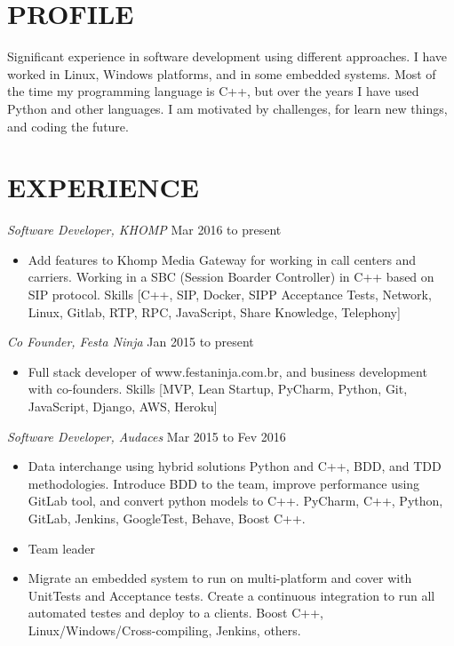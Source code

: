 \documentclass[line,margin]{res}
\begin{document}
\address{alvarofleith@gmail.com or +64 (09) 889-3534}
\address{https://linkedin.com/in/alvarofleith}


\begin{resume}

\section{PROFILE}       Significant experience in software development using different approaches. I have worked in Linux, Windows platforms, and in some embedded systems. Most of the time my programming language is C++, but over the years I have used Python and other languages. I am motivated by challenges, for learn new things, and coding the future.


 \section{EXPERIENCE} {\sl Software Developer, KHOMP} \hfill Mar 2016 to present \\
                 \begin{itemize}  \itemsep -2pt
                 \item Add features to Khomp Media Gateway for working in call centers and carriers. Working in a SBC (Session Boarder Controller) in C++ based on SIP protocol. Skills [C++, SIP, Docker, SIPP Acceptance Tests, Network, Linux, Gitlab, RTP, RPC, JavaScript, Share Knowledge, Telephony]
                \end{itemize}

                {\sl Co Founder, Festa Ninja} \hfill Jan 2015 to present \\
                 \begin{itemize}  \itemsep -2pt
                 \item Full stack developer of www.festaninja.com.br, and business development with co-founders. Skills [MVP, Lean Startup, PyCharm, Python, Git, JavaScript, Django, AWS, Heroku]
                 \end{itemize}

                {\sl Software Developer, Audaces} \hfill Mar 2015 to Fev 2016 \\
                  \begin{itemize}
                   \item Data interchange using hybrid solutions Python and C++, BDD, and TDD methodologies. Introduce BDD to the team, improve performance using GitLab tool, and convert python models to C++. PyCharm, C++, Python, GitLab, Jenkins, GoogleTest, Behave, Boost C++.
                   \item Team leader
                   \item Migrate an embedded system to run on multi-platform and cover with UnitTests and Acceptance tests. Create a continuous integration to run all automated testes and deploy to a clients. Boost C++, Linux/Windows/Cross-compiling, Jenkins, others.
                   \end{itemize}


\end{resume}
\end{document}
